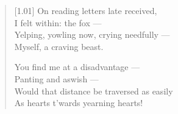 \begin{verse}[1.01\textwidth]
  On reading letters late received,\\
  I felt within: the fox ---\\
  Yelping, yowling now, crying needfully ---\\
  Myself, a craving beast.

  You find me at a disadvantage ---\\
  Panting and aswish ---\\
  Would that distance be traversed as easily\\
  As hearts t’wards yearning hearts!
\end{verse}
